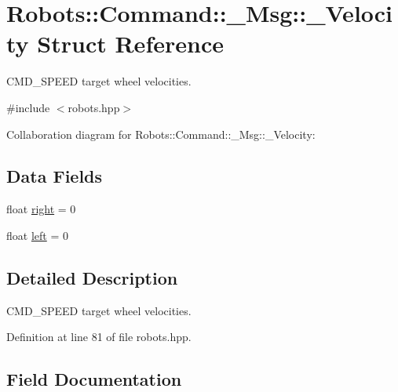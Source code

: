 \hypertarget{struct_robots_1_1_command_1_1___msg_1_1___velocity}{}\section{Robots\+:\+:Command\+:\+:\+\_\+\+Msg\+:\+:\+\_\+\+Velocity Struct Reference}
\label{struct_robots_1_1_command_1_1___msg_1_1___velocity}


C\+M\+D\+\_\+\+S\+P\+E\+ED target wheel velocities.  




{\ttfamily \#include $<$robots.\+hpp$>$}



Collaboration diagram for Robots\+:\+:Command\+:\+:\+\_\+\+Msg\+:\+:\+\_\+\+Velocity\+:
\subsection*{Data Fields}
\begin{DoxyCompactItemize}
\item 
float \hyperlink{struct_robots_1_1_command_1_1___msg_1_1___velocity_a2822c89acc2f922ebcae5bc18b76f95a}{right} = 0
\item 
float \hyperlink{struct_robots_1_1_command_1_1___msg_1_1___velocity_a232f831a43dd42cb03227b433961ca3f}{left} = 0
\end{DoxyCompactItemize}


\subsection{Detailed Description}
C\+M\+D\+\_\+\+S\+P\+E\+ED target wheel velocities. 

Definition at line 81 of file robots.\+hpp.



\subsection{Field Documentation}
\mbox{\label{struct_robots_1_1_command_1_1___msg_1_1___velocity_a232f831a43dd42cb03227b433961ca3f}} 
